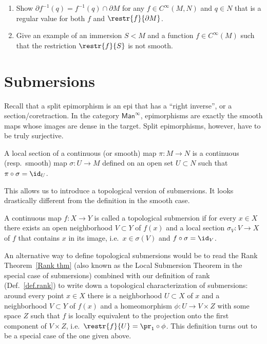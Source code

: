 \begin{xca}
\begin{enumerate}
    \item Show $\partial f^{-1}(q)=f^{-1}(q)\cap \partial M$ for any $f\in C^\infty(M,N)$ and $q\in N$ that is a regular value for both $f$ and $\restr{f}{\partial M}$.
    \item Give an example of an immersion $S<M$ and a function $f\in C^\infty(M)$ such that the restriction $\restr{f}{S}$ is not smooth.
\end{enumerate}

\end{xca}




\section{Submersions}\label{sec: submersions}

Recall that a split epimorphism is an epi that has a ``right inverse'', or a section/coretraction. In the category $\mathsf{Man}^\infty$, epimorphisms are exactly the smooth maps whose images are dense in the target. Split epimorphisms, however, have to be truly surjective.

\begin{defn}
A local section of a continuous (or smooth) map $\pi:M\to N$ is a continuous (resp.~smooth) map $\sigma :U\to M$ defined on an open set $U\subset N$ such that $\pi\circ\sigma =\id_U$.
\end{defn}

This allows us to introduce a topological version of submersions. It looks drastically different from the definition in the smooth case.

\begin{defn}
    A continuous map $f:X\to Y$ is called a topological submersion if for every $x\in X$ there exists an open neighborhood $V\subset Y$ of $f(x)$ and a local section $\sigma_V:V\to X$ of $f$ that contains $x$ in its image, i.e.~$x\in \sigma(V)$ and $f\circ\sigma=\id_V$. 
\end{defn}

An alternative way to define topological submersions would be to read the Rank Theorem~\ref{Rank thm} (also known as the Local Submersion Theorem in the special case of submersions) combined with our definition of rank (Def.~\ref{def.rank}) to write down a topological characterization of submersions: around every point $x\in X$ there is a neighborhood $U\subset X$ of $x$ and a neighborhood $V\subset Y$ of $f(x)$ and a homeomorphism $\phi:U\to V\times Z$ with some space $Z$ such that $f$ is locally equivalent to the projection onto the first component of $V\times Z$, i.e.~$\restr{f}{U}=\pr_1\circ \phi$. This definition turns out to be a special case of the one given above.

